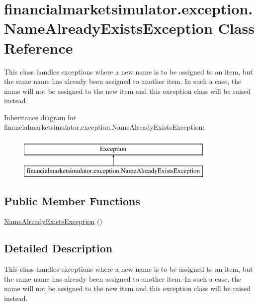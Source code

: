 \hypertarget{classfinancialmarketsimulator_1_1exception_1_1_name_already_exists_exception}{\section{financialmarketsimulator.\+exception.\+Name\+Already\+Exists\+Exception Class Reference}
\label{classfinancialmarketsimulator_1_1exception_1_1_name_already_exists_exception}
}


This class handles exceptions where a new name is to be assigned to an item, but the same name has already been assigned to another item. In such a case, the name will not be assigned to the new item and this exception class will be raised instead.  


Inheritance diagram for financialmarketsimulator.\+exception.\+Name\+Already\+Exists\+Exception\+:\begin{figure}[H]
\begin{center}
\leavevmode
\includegraphics[height=2.000000cm]{classfinancialmarketsimulator_1_1exception_1_1_name_already_exists_exception}
\end{center}
\end{figure}
\subsection*{Public Member Functions}
\begin{DoxyCompactItemize}
\item 
\hyperlink{classfinancialmarketsimulator_1_1exception_1_1_name_already_exists_exception_a8311de38d5862fbcfe2b10b0fbe31d2c}{Name\+Already\+Exists\+Exception} ()
\end{DoxyCompactItemize}


\subsection{Detailed Description}
This class handles exceptions where a new name is to be assigned to an item, but the same name has already been assigned to another item. In such a case, the name will not be assigned to the new item and this exception class will be raised instead. 

